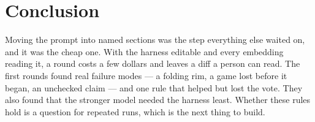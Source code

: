 \documentclass[10pt,letterpaper,twocolumn]{article}
\begin{document}
\section{Conclusion}
\label{sec:conclusion}

Moving the prompt into named sections was the step everything else waited on,
and it was the cheap one. With the harness editable and every embedding
reading it, a round costs a few dollars and leaves a diff a person can read.
The first rounds found real failure modes --- a folding rim, a game lost before
it began, an unchecked claim --- and one rule that helped but lost the vote.
They also found that the stronger model needed the harness least. Whether these
rules hold is a question for repeated runs, which is the next thing to build.

\balance


\end{document}
